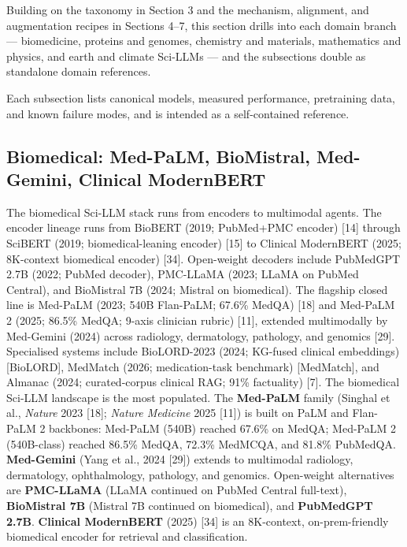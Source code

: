 Building on the taxonomy in Section 3 and the mechanism, alignment, and augmentation recipes in Sections 4--7, this section drills into each domain branch --- biomedicine, proteins and genomes, chemistry and materials, mathematics and physics, and earth and climate Sci-LLMs --- and the subsections double as standalone domain references.

Each subsection lists canonical models, measured performance, pretraining data, and known failure modes, and is intended as a self-contained reference.

\subsection{Biomedical: Med-PaLM, BioMistral, Med-Gemini, Clinical ModernBERT}\label{biomedical-med-palm-biomistral-med-gemini-clinical-modernbert}

The biomedical Sci-LLM stack runs from encoders to multimodal agents. The encoder lineage runs from BioBERT (2019; PubMed+PMC encoder) {[}14{]} through SciBERT (2019; biomedical-leaning encoder) {[}15{]} to Clinical ModernBERT (2025; 8K-context biomedical encoder) {[}34{]}. Open-weight decoders include PubMedGPT 2.7B (2022; PubMed decoder), PMC-LLaMA (2023; LLaMA on PubMed Central), and BioMistral 7B (2024; Mistral on biomedical). The flagship closed line is Med-PaLM (2023; 540B Flan-PaLM; 67.6\% MedQA) {[}18{]} and Med-PaLM 2 (2025; 86.5\% MedQA; 9-axis clinician rubric) {[}11{]}, extended multimodally by Med-Gemini (2024) across radiology, dermatology, pathology, and genomics {[}29{]}. Specialised systems include BioLORD-2023 (2024; KG-fused clinical embeddings) {[}BioLORD{]}, MedMatch (2026; medication-task benchmark) {[}MedMatch{]}, and Almanac (2024; curated-corpus clinical RAG; 91\% factuality) {[}7{]}. The biomedical Sci-LLM landscape is the most populated. The \textbf{Med-PaLM} family (Singhal et al., \emph{Nature} 2023 {[}18{]}; \emph{Nature Medicine} 2025 {[}11{]}) is built on PaLM and Flan-PaLM 2 backbones: Med-PaLM (540B) reached 67.6\% on MedQA; Med-PaLM 2 (540B-class) reached 86.5\% MedQA, 72.3\% MedMCQA, and 81.8\% PubMedQA. \textbf{Med-Gemini} (Yang et al., 2024 {[}29{]}) extends to multimodal radiology, dermatology, ophthalmology, pathology, and genomics. Open-weight alternatives are \textbf{PMC-LLaMA} (LLaMA continued on PubMed Central full-text), \textbf{BioMistral 7B} (Mistral 7B continued on biomedical), and \textbf{PubMedGPT 2.7B}. \textbf{Clinical ModernBERT} (2025) {[}34{]} is an 8K-context, on-prem-friendly biomedical encoder for retrieval and classification.

